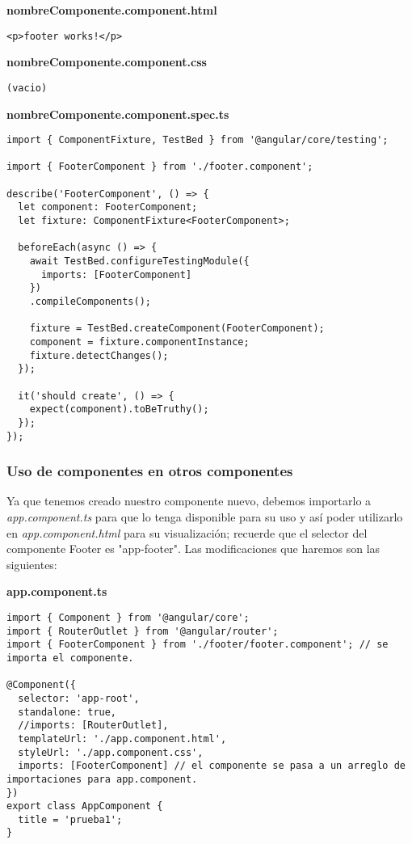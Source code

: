 \textbf{nombreComponente.component.html}
\begin{lstlisting}[style=htmlcssjs]
<p>footer works!</p>
\end{lstlisting}

\textbf{nombreComponente.component.css}
\begin{lstlisting}
(vacio)
\end{lstlisting}

\textbf{nombreComponente.component.spec.ts}
\begin{lstlisting}[style=htmlcssjs]
import { ComponentFixture, TestBed } from '@angular/core/testing';

import { FooterComponent } from './footer.component';

describe('FooterComponent', () => {
  let component: FooterComponent;
  let fixture: ComponentFixture<FooterComponent>;

  beforeEach(async () => {
    await TestBed.configureTestingModule({
      imports: [FooterComponent]
    })
    .compileComponents();
    
    fixture = TestBed.createComponent(FooterComponent);
    component = fixture.componentInstance;
    fixture.detectChanges();
  });

  it('should create', () => {
    expect(component).toBeTruthy();
  });
});
\end{lstlisting}


\subsubsection{Uso de componentes en otros componentes}

Ya que tenemos creado nuestro componente nuevo, debemos importarlo a \textit{app.component.ts} para que lo tenga disponible para su uso y así poder utilizarlo en \textit{app.component.html} para su visualización; recuerde que el selector del componente Footer es "app-footer". Las modificaciones que haremos son las siguientes:

\textbf{app.component.ts}
\begin{lstlisting}[style=htmlcssjs]
import { Component } from '@angular/core';
import { RouterOutlet } from '@angular/router';
import { FooterComponent } from './footer/footer.component'; // se importa el componente.

@Component({
  selector: 'app-root',
  standalone: true,
  //imports: [RouterOutlet],
  templateUrl: './app.component.html',
  styleUrl: './app.component.css',
  imports: [FooterComponent] // el componente se pasa a un arreglo de importaciones para app.component.
})
export class AppComponent {
  title = 'prueba1';
}
\end{lstlisting}

